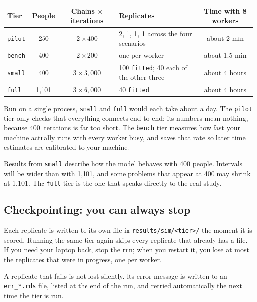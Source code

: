 \documentclass[11pt]{article}
\newcommand{\code}[1]{\texttt{\small #1}}
\begin{document}
\begin{center}
\small
\begin{tabularx}{\textwidth}{@{}l c c X c@{}}
\toprule
Tier & People & Chains $\times$ iterations & Replicates & Time with 8 workers \\
\midrule
\code{pilot} & 250 & $2\times400$ & 2, 1, 1, 1 across the four scenarios & about 2 min \\
\code{bench} & 400 & $2\times200$ & one per worker & about 1.5 min \\
\code{small} & 400 & $3\times3{,}000$ & 100 \code{fitted}; 40 each of the other three & about 4 hours \\
\code{full} & 1,101 & $3\times6{,}000$ & 40 \code{fitted} & about 4 hours \\
\bottomrule
\end{tabularx}
\end{center}

Run on a single process, \code{small} and \code{full} would each take about a day. The \code{pilot} tier only checks that everything connects end to end; its numbers mean nothing, because 400 iterations is far too short. The \code{bench} tier measures how fast your machine actually runs with every worker busy, and saves that rate so later time estimates are calibrated to your machine.

\begin{caution}
Results from \code{small} describe how the model behaves with 400 people. Intervals will be wider than with 1,101, and some problems that appear at 400 may shrink at 1,101. The \code{full} tier is the one that speaks directly to the real study.
\end{caution}

\subsection{Checkpointing: you can always stop}

Each replicate is written to its own file in \code{results/sim/<tier>/} the moment it is scored. Running the same tier again skips every replicate that already has a file. If you need your laptop back, stop the run; when you restart it, you lose at most the replicates that were in progress, one per worker.

A replicate that fails is not lost silently. Its error message is written to an \code{err\_*.rds} file, listed at the end of the run, and retried automatically the next time the tier is run.
\end{document}
